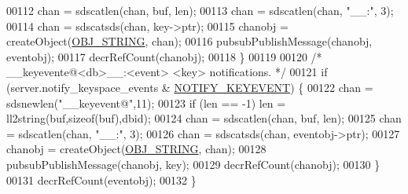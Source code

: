 \begin{DoxyCode}
00112         chan = sdscatlen(chan, buf, len);
00113         chan = sdscatlen(chan, \textcolor{stringliteral}{"\_\_:"}, 3);
00114         chan = sdscatsds(chan, key->ptr);
00115         chanobj = createObject(\hyperlink{server_8h_a65236ea160f69cdef33ec942092af88f}{OBJ\_STRING}, chan);
00116         pubsubPublishMessage(chanobj, eventobj);
00117         decrRefCount(chanobj);
00118     \}
00119 
00120     \textcolor{comment}{/* \_\_keyevente@<db>\_\_:<event> <key> notifications. */}
00121     \textcolor{keywordflow}{if} (server.notify\_keyspace\_events & \hyperlink{server_8h_a4db1f9cfaeccf1ee00d27aa50c4e5d1a}{NOTIFY\_KEYEVENT}) \{
00122         chan = sdsnewlen(\textcolor{stringliteral}{"\_\_keyevent@"},11);
00123         \textcolor{keywordflow}{if} (len == -1) len = ll2string(buf,\textcolor{keyword}{sizeof}(buf),dbid);
00124         chan = sdscatlen(chan, buf, len);
00125         chan = sdscatlen(chan, \textcolor{stringliteral}{"\_\_:"}, 3);
00126         chan = sdscatsds(chan, eventobj->ptr);
00127         chanobj = createObject(\hyperlink{server_8h_a65236ea160f69cdef33ec942092af88f}{OBJ\_STRING}, chan);
00128         pubsubPublishMessage(chanobj, key);
00129         decrRefCount(chanobj);
00130     \}
00131     decrRefCount(eventobj);
00132 \}
\end{DoxyCode}
